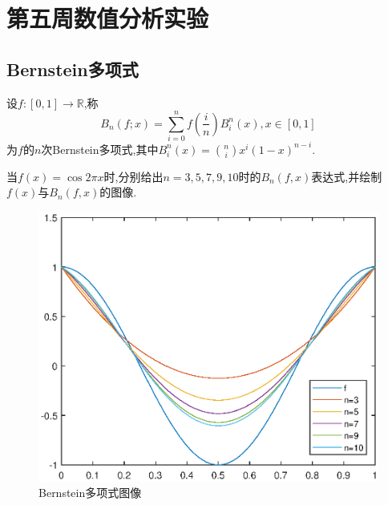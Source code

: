 \section{第五周数值分析实验}
\subsection{Bernstein多项式}
\begin{definition}
	设$f:[0,1]\to\mathbb{R}$,称
	$$
	B_n(f;x)=\sum_{i=0}^{n}f\left(\frac{i}{n}\right)B_i^n(x),x\in[0,1]
	$$
	为$f$的$n$次Bernstein多项式,其中$B_i^n(x)=\binom{n}{i}x^i(1-x)^{n-i}$.
\end{definition}

\begin{ex}
	当$f(x)=\cos 2\pi x$时,分别给出$n=3, 5, 7, 9, 10$时的$B_n(f,x)$表达式,并绘制$f(x)$与$B_n(f,x)$的图像.
\end{ex}

\begin{figure}[H]
	\centering
	\includegraphics[width = 0.6\linewidth]{day5/fig.eps}
	\caption{Bernstein多项式图像}
\end{figure}